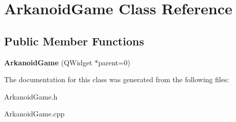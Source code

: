 \hypertarget{class_arkanoid_game}{\section{\-Arkanoid\-Game \-Class \-Reference}
\label{class_arkanoid_game}
}
\subsection*{\-Public \-Member \-Functions}
\begin{DoxyCompactItemize}
\item 
\hypertarget{class_arkanoid_game_aadf3474b516d50e163b6a7ee10154ea3}{{\bfseries \-Arkanoid\-Game} (\-Q\-Widget $\ast$parent=0)}\label{class_arkanoid_game_aadf3474b516d50e163b6a7ee10154ea3}

\end{DoxyCompactItemize}


\-The documentation for this class was generated from the following files\-:\begin{DoxyCompactItemize}
\item 
\-Arkanoid\-Game.\-h\item 
\-Arkanoid\-Game.\-cpp\end{DoxyCompactItemize}
